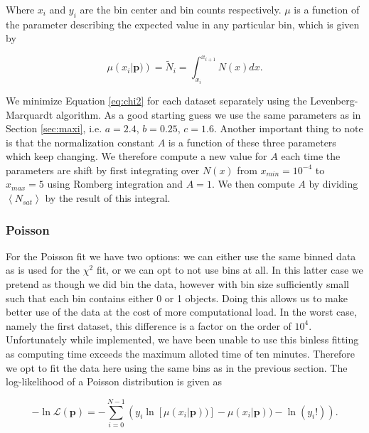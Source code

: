 Where $x_i$ and $y_i$ are the bin center and bin counts respectively. $\mu$ is a function of the parameter describing the expected value in any particular bin, which is given by

\begin{equation}
    \mu\left(x_i | \boldsymbol{p})\right) = \tilde N_i = \int_{x_i}^{x_{i+1}} N(x)dx.\label{eq:mean}
\end{equation}

We minimize Equation \ref{eq:chi2} for each dataset separately using the Levenberg-Marquardt algorithm. As a good starting guess we use the same parameters as in Section \ref{sec:maxi}, i.e. $a=2.4$, $b=0.25$, $c=1.6$. Another important thing to note is that the normalization constant $A$ is a function of these three parameters which keep changing. We therefore compute a new value for $A$ each time the parameters are shift by first integrating over $N(x)$ from $x_{min}=10^{-4}$ to $x_{max}=5$ using Romberg integration and $A=1$. We then compute $A$ by dividing $\left<N_{sat}\right>$ by the result of this integral.




\subsubsection{Poisson}

For the Poisson fit we have two options: we can either use the same binned data as is used for the $\chi^2$ fit, or we can opt to not use bins at all. In this latter case we pretend as though we did bin the data, however with bin size sufficiently small such that each bin contains either 0 or 1 objects. Doing this allows us to make better use of the data at the cost of more computational load. In the worst case, namely the first dataset, this difference is a factor on the order of $10^4$. Unfortunately while implemented, we have been unable to use this binless fitting as computing time exceeds the maximum alloted time of ten minutes. Therefore we opt to fit the data here using the same bins as in the previous section. The log-likelihood of a Poisson distribution is given as

\begin{equation}
    -\ln \mathcal{L}(\boldsymbol{p}) = -\sum_{i=0}^{N-1} \left(y_i\ln\left[\mu(x_i | \boldsymbol{p}))\right] - \mu(x_i | \boldsymbol{p})) - \ln(y_i!)\right).\label{eq:logL}
\end{equation}

